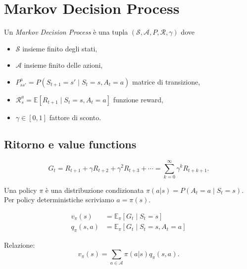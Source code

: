 \section{Markov Decision Process}

\begin{definition}[MDP]
Un \emph{Markov Decision Process} è una tupla $(\mathcal{S}, \mathcal{A}, P, \mathcal{R}, \gamma)$ dove
\begin{itemize}
  \item $\mathcal{S}$ insieme finito degli stati,
  \item $\mathcal{A}$ insieme finito delle azioni,
  \item $P^a_{ss'} = P(S_{t+1}=s' \mid S_t = s, A_t = a)$ matrice di transizione,
  \item $\mathcal{R}^a_s = \mathbb{E}[R_{t+1} \mid S_t = s, A_t = a]$ funzione reward,
  \item $\gamma \in [0,1]$ fattore di sconto.
\end{itemize}
\end{definition}

\subsection{Ritorno e value functions}

\begin{definition}[Ritorno]
\[
G_t = R_{t+1} + \gamma R_{t+2} + \gamma^2 R_{t+3} + \cdots = \sum_{k=0}^\infty \gamma^k R_{t+k+1}.
\]
\end{definition}

\begin{definition}[Policy]
Una policy $\pi$ è una distribuzione condizionata $\pi(a|s) = P(A_t = a \mid S_t = s)$. Per policy deterministiche scriviamo $a = \pi(s)$.
\end{definition}

\begin{definition}
\begin{align}
v_\pi(s) &= \mathbb{E}_\pi[G_t \mid S_t = s]\\
q_\pi(s,a) &= \mathbb{E}_\pi[G_t \mid S_t = s, A_t = a]
\end{align}
\end{definition}

Relazione:
\[
v_\pi(s) = \sum_{a\in\mathcal{A}} \pi(a|s) q_\pi(s, a).
\]

